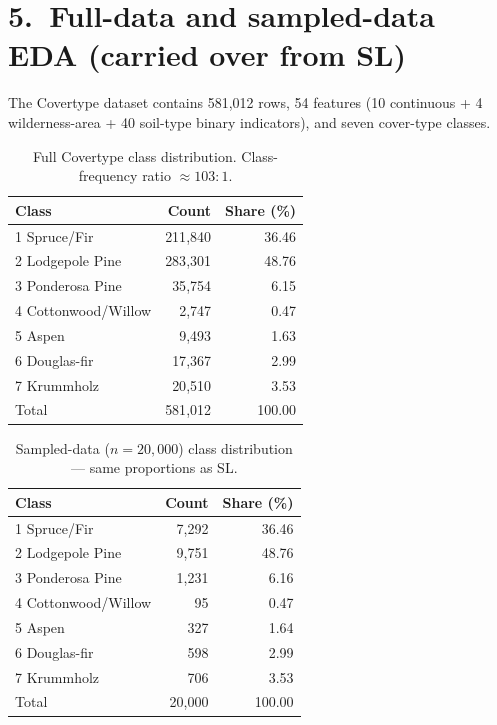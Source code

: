 \documentclass[11pt]{article}
\begin{document}
\section*{5.\ Full-data and sampled-data EDA (carried over from SL)}

The Covertype dataset contains 581{,}012 rows, 54 features
(10 continuous + 4 wilderness-area + 40 soil-type binary indicators),
and seven cover-type classes.

\begin{table}[h]\centering
\caption{Full Covertype class distribution. Class-frequency ratio $\approx 103{:}1$.}
\begin{tabularx}{0.85\linewidth}{Xrr}
\toprule
\textcolor{denimdark}{\textbf{Class}} & \textbf{Count} & \textbf{Share (\%)} \\
\midrule
1 Spruce/Fir        & 211{,}840 & 36.46 \\
2 Lodgepole Pine    & 283{,}301 & 48.76 \\
3 Ponderosa Pine    &  35{,}754 &  6.15 \\
4 Cottonwood/Willow &   2{,}747 &  0.47 \\
5 Aspen             &   9{,}493 &  1.63 \\
6 Douglas-fir       &  17{,}367 &  2.99 \\
7 Krummholz         &  20{,}510 &  3.53 \\
\midrule
Total               & 581{,}012 & 100.00 \\
\bottomrule
\end{tabularx}
\end{table}

\begin{table}[h]\centering
\caption{Sampled-data ($n{=}20{,}000$) class distribution --- same proportions as SL.}
\begin{tabularx}{0.85\linewidth}{Xrr}
\toprule
\textcolor{denimdark}{\textbf{Class}} & \textbf{Count} & \textbf{Share (\%)} \\
\midrule
1 Spruce/Fir        & 7{,}292 & 36.46 \\
2 Lodgepole Pine    & 9{,}751 & 48.76 \\
3 Ponderosa Pine    & 1{,}231 &  6.16 \\
4 Cottonwood/Willow &     95  &  0.47 \\
5 Aspen             &    327  &  1.64 \\
6 Douglas-fir       &    598  &  2.99 \\
7 Krummholz         &    706  &  3.53 \\
\midrule
Total               & 20{,}000 & 100.00 \\
\bottomrule
\end{tabularx}
\end{table}
\end{document}
